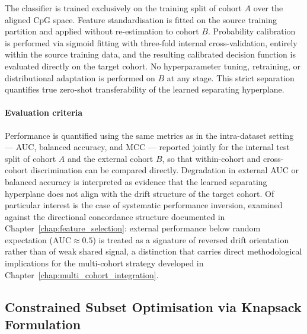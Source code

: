 The classifier is trained exclusively on the training split
of cohort $A$ over the aligned CpG space. Feature
standardisation is fitted on the source training partition
and applied without re-estimation to cohort $B$. Probability
calibration is performed via sigmoid fitting with three-fold
internal cross-validation, entirely within the source training
data, and the resulting calibrated decision function is
evaluated directly on the target cohort. No hyperparameter
tuning, retraining, or distributional adaptation is performed
on $B$ at any stage. This strict separation quantifies true
zero-shot transferability of the learned separating hyperplane.

\paragraph{Evaluation criteria}

Performance is quantified using the same metrics as in the
intra-dataset setting — AUC, balanced accuracy, and MCC —
reported jointly for the internal test split of cohort $A$ and
the external cohort $B$, so that within-cohort and
cross-cohort discrimination can be compared directly.
Degradation in external AUC or balanced accuracy is
interpreted as evidence that the learned separating hyperplane
does not align with the drift structure of the target cohort.
Of particular interest is the case of systematic performance
inversion, examined against the directional concordance
structure documented in Chapter~\ref{chap:feature_selection}:
external performance below random expectation
($\mathrm{AUC} \approx 0.5$) is treated as a signature of
reversed drift orientation rather than of weak shared signal,
a distinction that carries direct methodological implications
for the multi-cohort strategy developed in
Chapter~\ref{chap:multi_cohort_integration}.

\subsection{Constrained Subset Optimisation via Knapsack Formulation}
\label{sec:knapsack}

